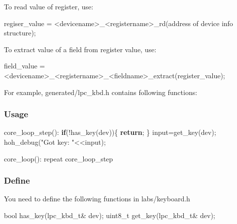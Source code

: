 \documentclass[]{book}
\newenvironment{Shaded}{}{}
\newcommand{\KeywordTok}[1]{\textbf{{#1}}}
\newcommand{\DataTypeTok}[1]{\textcolor[rgb]{0.50,0.00,0.00}{{#1}}}
\newcommand{\StringTok}[1]{\textcolor[rgb]{0.87,0.00,0.00}{{#1}}}
\newcommand{\NormalTok}[1]{{#1}}
\begin{document}
To read value of register, use:

\begin{Shaded}
\begin{Highlighting}[]
    \NormalTok{regiser_value = <devicename>_<registername>_rd(address of device info structure);}
\end{Highlighting}
\end{Shaded}

To extract value of a field from register value, use:

\begin{Shaded}
\begin{Highlighting}[]
    \NormalTok{field_value = <devicename>_<registername>_<fieldname>_extract(register_value);}
\end{Highlighting}
\end{Shaded}

For example, generated/lpc\_kbd.h contains following functions:

\subsubsection*{Usage}\label{usage-2}

\begin{Shaded}
\begin{Highlighting}[]
    \NormalTok{core_loop_step():}
        \KeywordTok{if}\NormalTok{(!has_key(dev))\{}
          \KeywordTok{return}\NormalTok{;}
        \NormalTok{\}}
        \NormalTok{input=get_key(dev);}
        \NormalTok{hoh_debug(}\StringTok{"Got key: "}\NormalTok{<<input);}

    \NormalTok{core_loop():}
        \NormalTok{repeat core_loop_step}
\end{Highlighting}
\end{Shaded}

\subsubsection*{Define}\label{define-2}

You need to define the following functions in labs/keyboard.h

\begin{Shaded}
\begin{Highlighting}[]
    \NormalTok{bool has_key(lpc_kbd_t& dev);}
    \DataTypeTok{uint8_t} \NormalTok{get_key(lpc_kbd_t& dev);}
\end{Highlighting}
\end{Shaded}
\end{document}
